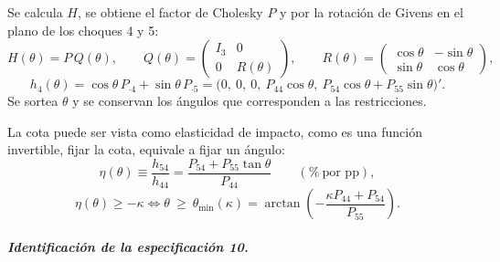\documentclass[12pt,letterpaper]{article}
\begin{document}
Se calcula $H$, se obtiene el factor de Cholesky $P$ y por la rotación de Givens en el plano de los choques 4 y 5:
\begin{equation}\label{eq:D_rotacion}
H(\theta) = P\,Q(\theta), \qquad
Q(\theta) = \begin{pmatrix} I_3 & 0\\ 0 & R(\theta) \end{pmatrix}, \qquad
R(\theta) = \begin{pmatrix} \cos\theta & -\sin\theta\\ \sin\theta & \cos\theta \end{pmatrix},
\end{equation}
\begin{equation}\label{eq:D_h4}
h_4(\theta) = \cos\theta\, P_{\cdot 4} + \sin\theta\, P_{\cdot 5} = \bigl(0,\ 0,\ 0,\ P_{44}\cos\theta,\ P_{54}\cos\theta + P_{55}\sin\theta\bigr)'.
\end{equation}
Se sortea $\theta$ y se conservan los ángulos que corresponden a las restricciones.

La cota puede ser vista como elasticidad de impacto, como es una función invertible, fijar la cota, equivale a fijar un ángulo:
\begin{equation}\label{eq:D_eta}
\eta(\theta) \equiv \frac{h_{54}}{h_{44}} = \frac{P_{54} + P_{55}\tan\theta}{P_{44}} \qquad (\%\ \text{por pp}),
\end{equation}
\begin{equation}\label{eq:D_thmin}
\eta(\theta) \ge -\kappa \iff \theta \ \ge\ \theta_{\min}(\kappa) = \arctan\!\left(-\frac{\kappa P_{44} + P_{54}}{P_{55}}\right).
\end{equation}

\subparagraph{Identificación de la especificación 10.}
\end{document}
